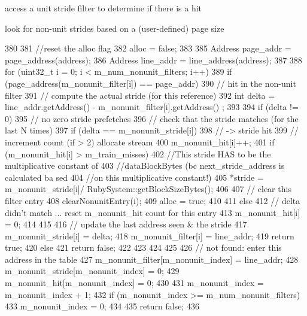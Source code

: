 access a unit stride filter to determine if there is a hit 

look for non-\/unit strides based on a (user-\/defined) page size 


\begin{DoxyCode}
380 {
381     //reset the alloc flag
382     alloc = false;
383 
385     Address page_addr = page_address(address);
386     Address line_addr = line_address(address);
387 
388     for (uint32_t i = 0; i < m_num_nonunit_filters; i++) {
389         if (page_address(m_nonunit_filter[i]) == page_addr) {
390             // hit in the non-unit filter
391             // compute the actual stride (for this reference)
392             int delta = line_addr.getAddress() - m_nonunit_filter[i].getAddress()
      ;
393 
394             if (delta != 0) {
395                 // no zero stride prefetches
396                 // check that the stride matches (for the last N times)
397                 if (delta == m_nonunit_stride[i]) {
398                     // -> stride hit
399                     // increment count (if > 2) allocate stream
400                     m_nonunit_hit[i]++;
401                     if (m_nonunit_hit[i] > m_train_misses) {
402                         //This stride HAS to be the multiplicative constant of
403                         //dataBlockBytes (bc next_stride_address is calculated ba
      sed
404                         //on this multiplicative constant!)
405                         *stride = m_nonunit_stride[i]/
      RubySystem::getBlockSizeBytes();
406 
407                         // clear this filter entry
408                         clearNonunitEntry(i);
409                         alloc = true;
410                     }
411                 } else {
412                     // delta didn't match ... reset m_nonunit_hit count for this 
      entry
413                     m_nonunit_hit[i] = 0;
414                 }
415 
416                 // update the last address seen & the stride
417                 m_nonunit_stride[i] = delta;
418                 m_nonunit_filter[i] = line_addr;
419                 return true;
420             } else {
421                 return false;
422             }
423         }
424     }
425 
426     // not found: enter this address in the table
427     m_nonunit_filter[m_nonunit_index] = line_addr;
428     m_nonunit_stride[m_nonunit_index] = 0;
429     m_nonunit_hit[m_nonunit_index]    = 0;
430 
431     m_nonunit_index = m_nonunit_index + 1;
432     if (m_nonunit_index >= m_num_nonunit_filters) {
433         m_nonunit_index = 0;
434     }
435     return false;
436 }
\end{DoxyCode}
